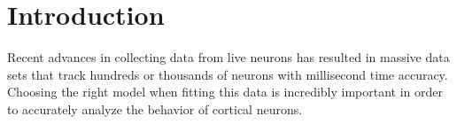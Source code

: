 \documentclass[11pt]{article}
\newcommand{\todo}{\textcolor{red}{\textbf{\ding{55} TODO:~}}}
\newcommand{\inprog}{\textcolor{orange}{\textbf{IN PROGRESS:~}}}
\newcommand{\needsreview}{\textcolor{magenta}{\textbf{NEEDS REVIEW:~}}}
\begin{document}
    
    
    
    

    

\section{Introduction}
\label{sec:intro}
Recent advances in collecting data from live neurons has resulted in massive data sets that track hundreds or thousands of neurons with millisecond time accuracy. Choosing the right model when fitting this data is incredibly important in order to accurately analyze the behavior of cortical neurons.
\end{document}

